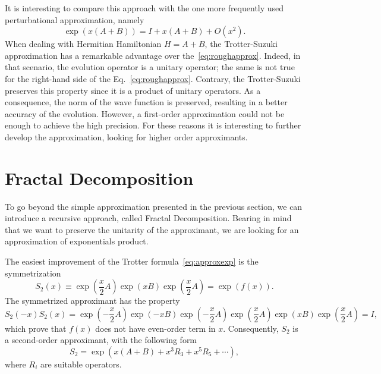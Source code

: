 It is interesting to compare this approach with the one more frequently used perturbational approximation, namely
\begin{equation} \label{eq:roughapprox}
\exp\left({x(A+B)}\right) = I + x(A+B) + O(x^2).
\end{equation}
When dealing with Hermitian Hamiltonian $H=A+B$, the Trotter-Suzuki approximation has a remarkable advantage over the~\eqref{eq:roughapprox}. Indeed, in that scenario, the evolution operator is a unitary operator; the same is not true for the right-hand side of the Eq.~\eqref{eq:roughapprox}. Contrary, the Trotter-Suzuki preserves this property since it is a product of unitary operators. As a consequence, the norm of the wave function is preserved, resulting in a better accuracy of the evolution. However, a first-order approximation could not be enough  to achieve the high precision. For these reasons it is interesting to further develop the approximation, looking for higher order approximants.

\section{Fractal Decomposition}
To go beyond the simple approximation presented in the previous section, we can introduce a recursive approach, called Fractal Decomposition. Bearing in mind that we want to preserve the unitarity of the approximant, we are looking for an approximation of exponentials product.

The easiest improvement of the Trotter formula~\eqref{eq:approxexp} is the symmetrization
\begin{equation} 
S_2(x) \equiv \exp\left({\frac{x}{2}A}\right) \exp\left({xB}\right) \exp\left({\frac{x}{2}A}\right) = \exp\left({f(x)}\right).
\end{equation}
The symmetrized approximant has the property
\begin{equation}
S_2(-x) S_2(x) = \exp\left({-\frac{x}{2}A}\right) \exp\left({-xB}\right) \exp\left({-\frac{x}{2}A}\right) \exp\left({\frac{x}{2}A}\right) \exp\left({xB}\right) \exp\left({\frac{x}{2}A}\right) = I,
\end{equation}
which prove that $f(x)$ does not have even-order term in $x$. Consequently, $S_2$ is a second-order approximant, with the following form
\begin{equation} \label{eq:S2-form}
S_2 = \exp\left({x(A+B) + x^3R_3 + x^5R_5 + \cdots}\right),
\end{equation}
where $R_i$ are suitable operators.

